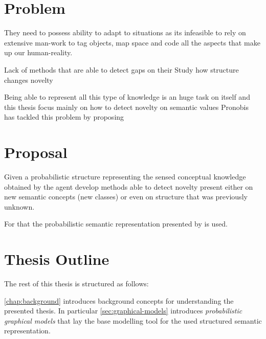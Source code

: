 \section{Problem}


They need to possess ability to adapt to situations as its infeasible to rely
on extensive man-work to tag objects, map space and code all the aspects that
make up our human-reality.


Lack of methods that are able to detect gaps on their
Study how structure changes novelty

Being able to represent all this type of knowledge is an huge task on itself and this thesis
focus mainly on how to detect novelty on semantic values  
Pronobis~\cite{pronobis2011phd} has tackled this problem by proposing 


\section{Proposal}

%
Given a probabilistic structure representing the sensed conceptual knowledge
obtained by the agent develop methods able to detect novelty present
either on new semantic concepts (new classes) or even on structure that was
previously unknown.


For that the probabilistic semantic representation presented by
\cite{pronobis2011phd} is used.

%



\section{Thesis Outline}
The rest of this thesis is structured as follows:

\autoref{chap:background} introduces background concepts for understanding the
presented thesis. In particular \autoref{sec:graphical-models} introduces
\emph{probabilistic graphical models} that lay the base modelling tool for
the used structured semantic representation.


